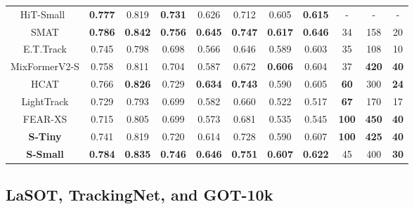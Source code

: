 \begin{table}
{\begin{tabular}{c |c c  c |c c |c c |c c c}
	HiT-Small~\cite{kang2023exploring} & \color{ForestGreen} \bf{0.777} & 0.819 & \color{ForestGreen} \bf{0.731} & 0.626 & 0.712 & 0.605 & \color{ForestGreen} \bf{0.615} & - & - & -\\
	SMAT \cite{gopal2024separable} &  \color{Mahogany} \bf{0.786} &  \color{Mahogany} \bf{0.842}  &  \color{Mahogany} \bf{0.756} &  \color{RoyalBlue} \bf{0.645}  &  \color{RoyalBlue} \bf{0.747} &  \color{Mahogany} \bf{0.617}  &  \color{Mahogany} \bf{0.646}  & 34 & 158 & 20 \\
	E.T.Track \cite{blatter2023efficient} & 0.745  & 0.798  & 0.698 & 0.566  & 0.646 & 0.589  & 0.603 & 35 & 108 & 10 \\
	MixFormerV2-S \cite{cui2024mixformerv2} & 0.758  & 0.811  & 0.704 & 0.587  & 0.672 & \color{ForestGreen} \bf{0.606}  & 0.604  & 37 & \color{ForestGreen} \bf{420} & \color{Mahogany} \bf{40} \\
	HCAT \cite{chen2022efficient} & 0.766  & \color{ForestGreen} \bf{0.826}  & 0.729 & \color{ForestGreen} \bf{0.634}  & \color{ForestGreen} \bf{0.743} & 0.590  & 0.605 & \color{ForestGreen} \bf{60} & 300 & \color{ForestGreen} \bf{24} \\
	LightTrack \cite{yan2021lighttrack} & 0.729  & 0.793  & 0.699 & 0.582  & 0.660  & 0.522  & 0.517 & \color{RoyalBlue} \bf{67} & 170 & 17 \\
	FEAR-XS \cite{borsuk2022fear} & 0.715 & 0.805 & 0.699 & 0.573  & 0.681  & 0.535  & 0.545 &  \color{Mahogany} \bf{100} & \color{Mahogany} \bf{450} & \color{Mahogany} \bf{40}\\
  
	
	\rowcolor{lightgray!20} \bf{S-Tiny}  & 0.741  & 0.819  & 0.720 & 0.614  & 0.728 & 0.590  &  0.607  &  \color{Mahogany} \bf{100} & \color{RoyalBlue} \bf{425} & \color{Mahogany} \bf{40}\\
	\rowcolor{lightgray!20} \bf{S-Small} & \color{RoyalBlue} \bf{0.784}  & \color{RoyalBlue} \bf{0.835}  & \color{RoyalBlue} \bf{0.746} & \color{Mahogany} \bf{0.646}  &  \color{Mahogany} \bf{0.751}  & \color{RoyalBlue} \bf{0.607}  & \color{RoyalBlue} \bf{0.622}  &  45 & 400 & \color{RoyalBlue} \bf{30}\\
	\hline
	\end{tabular}
	}
  \end{table}

  \subsection{LaSOT, TrackingNet, and GOT-10k}
  
